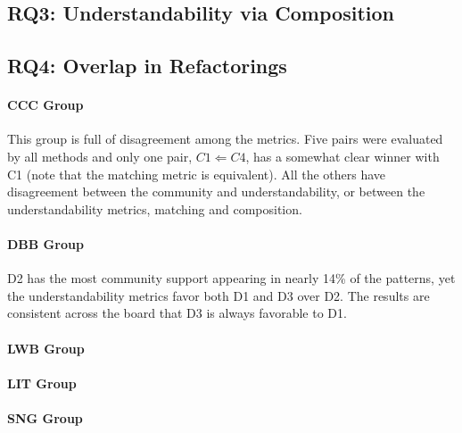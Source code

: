 


\subsection{RQ3: Understandability via Composition}

\subsection{RQ4: Overlap in Refactorings}

\paragraph{CCC Group}
This group is full of disagreement among the metrics. Five pairs were evaluated by all methods and only one pair, $C1 \Leftarrow C4$, has a somewhat clear winner with C1 (note that the matching metric is equivalent). All the others have disagreement between the community and understandability, or between the understandability metrics, matching and composition. 


\paragraph{DBB Group}
D2 has the most community support appearing in nearly 14\% of the patterns, yet the understandability metrics favor both D1 and D3 over D2. The results are consistent across the board that D3 is always favorable to D1. 

\paragraph{LWB Group}

\paragraph{LIT Group}

\paragraph{SNG Group}





